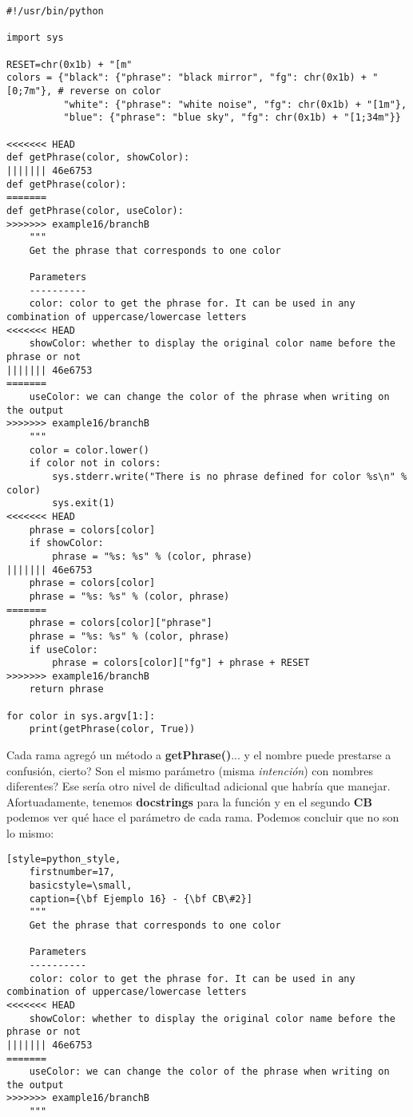 \begin{lstlisting}[style=python_style,
	basicstyle=\small,
	caption={\bf Ejemplo 16} - todo el archivo]
#!/usr/bin/python

import sys

RESET=chr(0x1b) + "[m"
colors = {"black": {"phrase": "black mirror", "fg": chr(0x1b) + "[0;7m"}, # reverse on color
          "white": {"phrase": "white noise", "fg": chr(0x1b) + "[1m"},
          "blue": {"phrase": "blue sky", "fg": chr(0x1b) + "[1;34m"}}

<<<<<<< HEAD
def getPhrase(color, showColor):
||||||| 46e6753
def getPhrase(color):
=======
def getPhrase(color, useColor):
>>>>>>> example16/branchB
    """
    Get the phrase that corresponds to one color
    
    Parameters
    ----------
    color: color to get the phrase for. It can be used in any combination of uppercase/lowercase letters
<<<<<<< HEAD
    showColor: whether to display the original color name before the phrase or not
||||||| 46e6753
=======
    useColor: we can change the color of the phrase when writing on the output
>>>>>>> example16/branchB
    """
    color = color.lower()
    if color not in colors:
        sys.stderr.write("There is no phrase defined for color %s\n" % color)
        sys.exit(1)
<<<<<<< HEAD
    phrase = colors[color]
    if showColor:
        phrase = "%s: %s" % (color, phrase)
||||||| 46e6753
    phrase = colors[color]
    phrase = "%s: %s" % (color, phrase)
=======
    phrase = colors[color]["phrase"]
    phrase = "%s: %s" % (color, phrase)
    if useColor:
        phrase = colors[color]["fg"] + phrase + RESET
>>>>>>> example16/branchB
    return phrase

for color in sys.argv[1:]:
    print(getPhrase(color, True))
\end{lstlisting}

Cada rama agregó un método a {\bf getPhrase()}... y el nombre puede prestarse a confusión, cierto? Son el mismo parámetro (misma
{\it intención}) con nombres diferentes? Ese sería {\bf} otro nivel de dificultad adicional que habría que manejar. Afortuadamente,
tenemos {\bf docstrings} para la función y en el segundo {\bf CB} podemos ver qué hace el parámetro de cada rama. Podemos concluir
que no son lo mismo:

\begin{lstlisting}[style=python_style,
	firstnumber=17,
	basicstyle=\small,
	caption={\bf Ejemplo 16} - {\bf CB\#2}]
    """
    Get the phrase that corresponds to one color
    
    Parameters
    ----------
    color: color to get the phrase for. It can be used in any combination of uppercase/lowercase letters
<<<<<<< HEAD
    showColor: whether to display the original color name before the phrase or not
||||||| 46e6753
=======
    useColor: we can change the color of the phrase when writing on the output
>>>>>>> example16/branchB
    """
\end{lstlisting}

